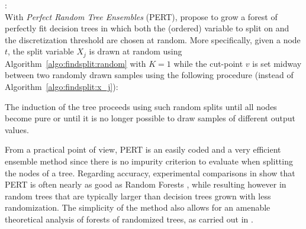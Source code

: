 \begin{description}
\item \citet{cutler:2001}: \hfill \\
    With \textit{Perfect Random Tree Ensembles} (PERT), \citet{cutler:2001}
    propose to grow a forest of perfectly fit decision trees in which both the
    (ordered) variable to split on and the discretization threshold are chosen
    at random. More specifically, given a node $t$, the split variable $X_j$ is
    drawn at random using Algorithm~\ref{algo:findsplit:random} with $K=1$
    while the cut-point $v$ is set midway between two randomly drawn samples using
    the following procedure (instead of Algorithm~\ref{algo:findsplit:x_j}):
    The induction of the tree proceeds using such random splits until
    all nodes become pure or until it is no longer possible to draw samples
    of different output values.

    From a practical point of view, PERT is an easily coded and a very
    efficient ensemble method since there is no impurity criterion to evaluate
    when splitting the nodes of a tree. Regarding accuracy, experimental
    comparisons in \citep{cutler:2001} show that PERT is often nearly as good as
    Random Forests \citep{breiman:2001}, while resulting however in random
    trees that are typically larger than  decision trees grown with
    less randomization. The simplicity of the method also allows for an amenable
    theoretical analysis of forests of randomized trees, as carried out in \citep{zhao:2000}.


\end{description}
